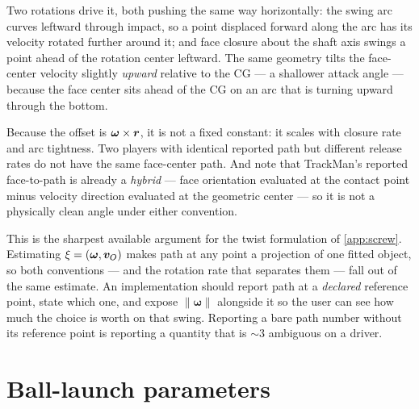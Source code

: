 Two rotations drive it, both pushing the same way horizontally: the swing
arc curves leftward through impact, so a point displaced forward along the
arc has its velocity rotated further around it; and face closure about the
shaft axis swings a point ahead of the rotation center leftward. The same
geometry tilts the face-center velocity slightly \emph{upward} relative to
the CG --- a shallower attack angle --- because the face center sits ahead
of the CG on an arc that is turning upward through the bottom.

\begin{keypoint}
Because the offset is $\boldsymbol{\omega}\times\bm{r}$, it is not a
fixed constant: it scales with closure rate and arc tightness. Two players
with identical reported path but different release rates do not have the
same face-center path. And note that TrackMan's reported face-to-path is
already a \emph{hybrid} --- face orientation evaluated at the contact
point minus velocity direction evaluated at the geometric center --- so it
is not a physically clean angle under either convention.
\end{keypoint}

\begin{implication}
This is the sharpest available argument for the twist formulation of
\cref{app:screw}. Estimating $\xi = (\boldsymbol{\omega}, \bm{v}_O)$
makes path at any point a projection of one fitted object, so both
conventions --- and the rotation rate that separates them --- fall out of
the same estimate. An implementation should report path at a
\emph{declared} reference point, state which one, and expose
$\lVert\boldsymbol{\omega}\rVert$ alongside it so the user can see how
much the choice is worth on that swing. Reporting a bare path number
without its reference point is reporting a quantity that is
$\sim$3\degs{} ambiguous on a driver.
\end{implication}

\section{Ball-launch parameters}

